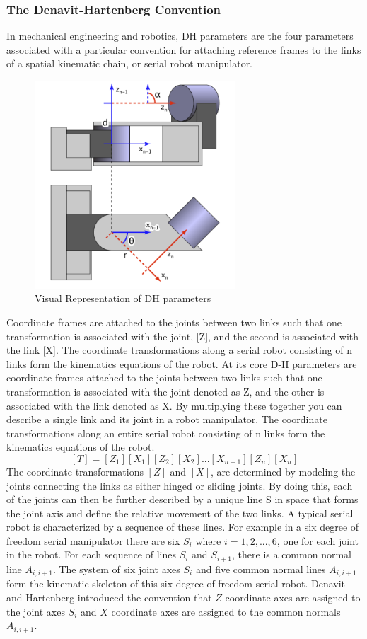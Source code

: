         \subsubsection{The Denavit-Hartenberg Convention}
            In mechanical engineering and robotics, DH parameters are the four parameters associated with a particular convention for attaching reference frames to the links of a spatial kinematic chain, or serial robot manipulator.
            \begin{figure}[H]
                \centering
                \includegraphics[width=75mm]{Dh.PNG}
                \caption{Visual Representation of DH parameters}
                \label{fig:DHParams_Visual}
            \end{figure}
            Coordinate frames are attached to the joints between two links such that one transformation is associated with the joint, [Z], and the second is associated with the link [X]. The coordinate transformations along a serial robot consisting of n links form the kinematics equations of the robot. At its core D-H parameters are coordinate frames attached to the joints between two links such that one transformation is associated with the joint denoted as Z, and the other is associated with the link denoted as X. By multiplying these together you can describe a single link and its joint in a robot manipulator. The coordinate transformations along an entire serial robot consisting of n links form the kinematics equations of the robot.
            $$
            [T] = [Z_1][X_1][Z_2][X_2]...[X_{n-1}][Z_n][X_n]
            $$
            The coordinate transformations $[Z]$ and $[X]$, are determined by modeling the joints connecting the links as either hinged or sliding joints. By doing this, each of the joints can then be further described by a unique line S in space that forms the joint axis and define the relative movement of the two links. A typical serial robot is characterized by a sequence of these lines. For example in a six degree of freedom serial manipulator there are six $S_i$ where $i = 1, 2,..., 6$, one for each joint in the robot. For each sequence of lines $S_i$ and $S_{i+1}$, there is a common normal line $A_{i,i+1}$. The system of six joint axes $S_i$ and five common normal lines $A_{i,i+1}$ form the kinematic skeleton of this six degree of freedom serial robot. Denavit and Hartenberg introduced the convention that $Z$ coordinate axes are assigned to the joint axes $S_i$ and $X$ coordinate axes are assigned to the common normals $A_{i,i+1}$.

